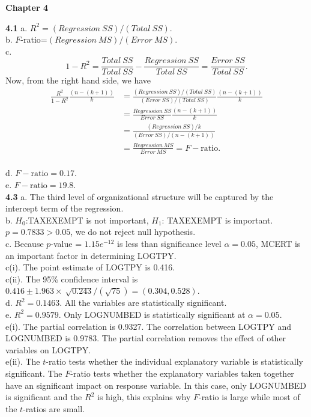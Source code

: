 \begin{center}\large \textbf{Chapter 4}\end{center}


\textbf{4.1} a. $R^2 = (Regression~SS)/(Total~SS)$. \\ b. $F$-ratio=$(Regression~MS)/(Error~MS)$.\\
c. \begin{equation*}1-R^2 =
\frac{Total~SS}{Total~SS}-\frac{Regression~SS}{Total~SS}=
\frac{Error~SS}{Total~SS}.
\end{equation*}
Now, from the right hand side, we have
\begin{align*}
\frac{R^2}{1-R^2} \frac{(n-(k+1))}{k}
&=\frac{(Regression~SS)/(Total~SS)}{(Error~SS)/(Total~SS)}\frac{(n-(k+1))}{k}\\
&= \frac{Regression~SS}{Error~SS}\frac{(n-(k+1))}{k}\\
&=\frac{(Regression~SS)/k}{(Error~SS)/(n-(k+1))}\\
&=\frac{Regression~MS}{Error~MS} = F-\mathrm{ratio}.
\end{align*}\\
d. $F-\mathrm{ratio}=0.17.$\\
e. $F-\mathrm{ratio}=19.8.$\\


\textbf{4.3} a. The third level of organizational structure
will be captured by the intercept term of the regression.\\
b. $H_0$:TAXEXEMPT is not important, $H_1$: TAXEXEMPT is important.
$p=0.7833>0.05$, we do not reject null
hypothesis.\\
c. Because $p$-value = $1.15e^{-12}$ is less than significance level
$\alpha=0.05$, MCERT is an important factor in
determining LOGTPY.\\
c(i). The point estimate of LOGTPY is 0.416.\\
c(ii). The 95\% confidence interval is
$0.416 \pm 1.963\times\ \sqrt{0.243}/(\sqrt{75}) = (0.304,0.528)$.\\
d. $R^2=0.1463$. All the variables are
statistically significant.\\
e. $R^2=0.9579$. Only LOGNUMBED is statistically
significant at $\alpha=0.05$.\\
e(i). The partial correlation is 0.9327. The correlation between
LOGTPY and LOGNUMBED is 0.9783. The partial
correlation removes the effect of other variables on LOGTPY.\\
e(ii). The $t$-ratio tests whether the individual explanatory
variable is statistically significant. The $F$-ratio tests whether
the explanatory variables taken together have an significant impact
on response variable. In this case, only LOGNUMBED is significant
and the $R^2$ is high, this explains why $F$-ratio is large while
most of the
$t$-ratios are small.\\

